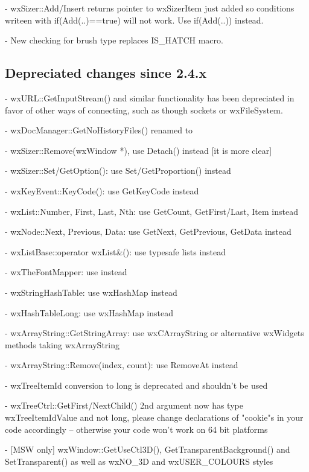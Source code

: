 - wxSizer::Add/Insert returns pointer to wxSizerItem just added so conditions
  writeen with if(Add(..)==true) will not work. Use if(Add(..)) instead.

- New  checking for brush type replaces IS_HATCH macro.



\subsection{Depreciated changes since 2.4.x}\label{depreciatedsince24}

- wxURL::GetInputStream() and similar functionality has been depreciated in
  favor of other ways of connecting, such as though sockets or wxFileSystem.

- wxDocManager::GetNoHistoryFiles() renamed to 

- wxSizer::Remove(wxWindow *), use Detach() instead [it is more clear]

- wxSizer::Set/GetOption(): use Set/GetProportion() instead

- wxKeyEvent::KeyCode(): use GetKeyCode instead

- wxList::Number, First, Last, Nth: use GetCount, GetFirst/Last, Item instead

- wxNode::Next, Previous, Data: use GetNext, GetPrevious, GetData instead

- wxListBase::operator wxList&(): use typesafe lists instead

- wxTheFontMapper: use  instead

- wxStringHashTable: use wxHashMap instead

- wxHashTableLong: use wxHashMap instead

- wxArrayString::GetStringArray: use wxCArrayString or alternative wxWidgets
                                 methods taking wxArrayString

- wxArrayString::Remove(index, count): use RemoveAt instead

- wxTreeItemId conversion to long is deprecated and shouldn't be used

- wxTreeCtrl::GetFirst/NextChild() 2nd argument now has type wxTreeItemIdValue
  and not long, please change declarations of "cookie"s in your code
  accordingly -- otherwise your code won't work on 64 bit platforms

- [MSW only] wxWindow::GetUseCtl3D(), GetTransparentBackground() and
             SetTransparent() as well as wxNO\_3D and wxUSER\_COLOURS styles

